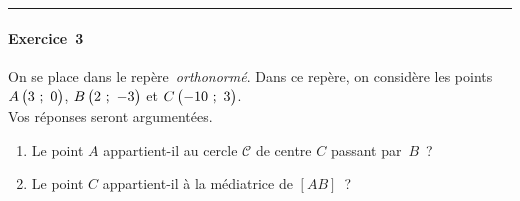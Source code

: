\begin{minipage}{0.45\textwidth}
\vspace*{2em}

\hrule

\vspace*{2em}

\paragraph{Exercice~3} %
On se place dans le repère~\emph{orthonormé}. Dans ce repère, on considère les points $A\begin{pmatrix}3~;~0\end{pmatrix}$, $B\begin{pmatrix}2~;~-3\end{pmatrix}$ et $C\begin{pmatrix}-10~;~3\end{pmatrix}$.\\Vos réponses seront argumentées.

	\begin{enumerate}
		\item Le point $A$ appartient-il au cercle $\mathscr{C}$ de centre $C$ passant par~$B$~?
		\item Le point $C$ appartient-il à la médiatrice de $\left[AB\right]$~?
	\end{enumerate}



\vspace{-2em}


\end{minipage}
\newpage

\vspace*{1em}

